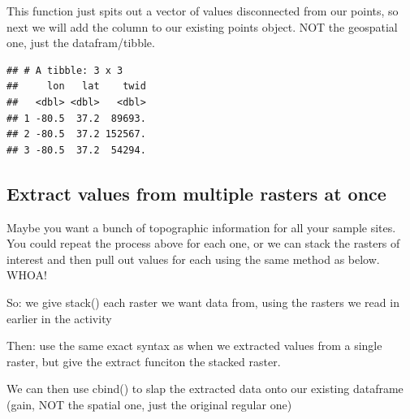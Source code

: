 \documentclass[
]{book}
\newenvironment{Shaded}{\begin{snugshade}}{\end{snugshade}}
\newcommand{\AttributeTok}[1]{\textcolor[rgb]{0.77,0.63,0.00}{#1}}
\newcommand{\CommentTok}[1]{\textcolor[rgb]{0.56,0.35,0.01}{\textit{#1}}}
\newcommand{\FunctionTok}[1]{\textcolor[rgb]{0.00,0.00,0.00}{#1}}
\newcommand{\NormalTok}[1]{#1}
\newcommand{\OtherTok}[1]{\textcolor[rgb]{0.56,0.35,0.01}{#1}}
\newcommand{\SpecialCharTok}[1]{\textcolor[rgb]{0.00,0.00,0.00}{#1}}
\newcommand{\StringTok}[1]{\textcolor[rgb]{0.31,0.60,0.02}{#1}}
\begin{document}
This function just spits out a vector of values disconnected from our points, so next we will add the column to our existing points object. NOT the geospatial one, just the datafram/tibble.

\begin{Shaded}
\end{Shaded}

\begin{verbatim}
## # A tibble: 3 x 3
##     lon   lat    twid
##   <dbl> <dbl>   <dbl>
## 1 -80.5  37.2  89693.
## 2 -80.5  37.2 152567.
## 3 -80.5  37.2  54294.
\end{verbatim}

\hypertarget{extract-values-from-multiple-rasters-at-once}{%
\subsection{Extract values from multiple rasters at once}\label{extract-values-from-multiple-rasters-at-once}}

Maybe you want a bunch of topographic information for all your sample sites. You could repeat the process above for each one, or we can stack the rasters of interest and then pull out values for each using the same method as below. WHOA!

So: we give stack() each raster we want data from, using the rasters we read in earlier in the activity

Then: use the same exact syntax as when we extracted values from a single raster, but give the extract funciton the stacked raster.

We can then use cbind() to slap the extracted data onto our existing dataframe (gain, NOT the spatial one, just the original regular one)
\end{document}
